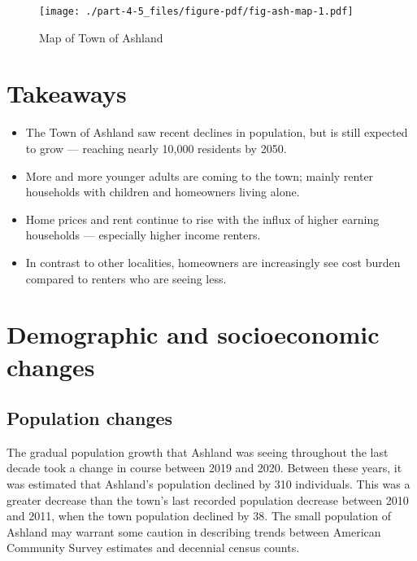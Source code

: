 \documentclass[
  letterpaper,
  DIV=11,
  numbers=noendperiod]{scrreprt}
\providecommand{\tightlist}{%
  \setlength{\itemsep}{0pt}\setlength{\parskip}{0pt}}\usepackage{longtable,booktabs,array}
\begin{document}
\begin{figure}

{\centering \texttt{[image: ./part-4-5\_files/figure-pdf/fig-ash-map-1.pdf]}

}

\caption{\label{fig-ash-map}Map of Town of Ashland}

\end{figure}

\hypertarget{takeaways-4}{%
\section{Takeaways}\label{takeaways-4}}

\begin{itemize}
\tightlist
\item
  The Town of Ashland saw recent declines in population, but is still
  expected to grow --- reaching nearly 10,000 residents by 2050.
\item
  More and more younger adults are coming to the town; mainly renter
  households with children and homeowners living alone.
\item
  Home prices and rent continue to rise with the influx of higher
  earning households --- especially higher income renters.
\item
  In contrast to other localities, homeowners are increasingly see cost
  burden compared to renters who are seeing less.
\end{itemize}

\hypertarget{demographic-and-socioeconomic-changes-4}{%
\section{Demographic and socioeconomic
changes}\label{demographic-and-socioeconomic-changes-4}}

\hypertarget{population-changes-4}{%
\subsection{Population changes}\label{population-changes-4}}

The gradual population growth that Ashland was seeing throughout the
last decade took a change in course between 2019 and 2020. Between these
years, it was estimated that Ashland's population declined by 310
individuals. This was a greater decrease than the town's last recorded
population decrease between 2010 and 2011, when the town population
declined by 38. The small population of Ashland may warrant some caution
in describing trends between American Community Survey estimates and
decennial census counts.
\end{document}
